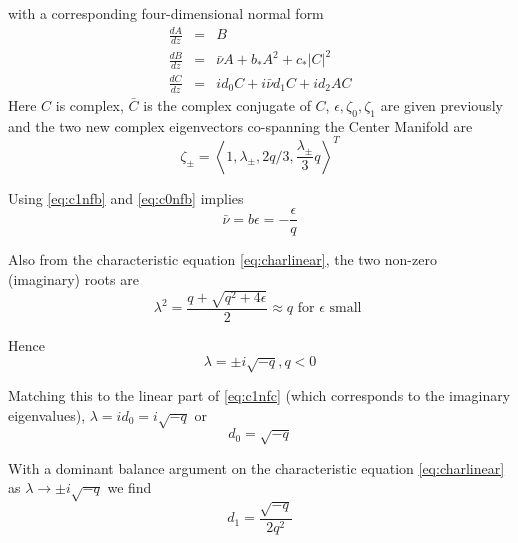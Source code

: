 with  a corresponding four-dimensional normal form
\begin{subequations}\label{eq:c1nf}
\begin{eqnarray}
\frac{dA}{dz} &=& B  \label{eq:c1nfa} \\
\frac{dB}{dz} &=& \bar{\nu} A + b_* A^2 + c_* \left|C\right|^2  \label{eq:c1nfb} \\
\frac{dC}{dz} &=& i d_0 C + i \bar{\nu} d_1 C + i d_2 A C \label{eq:c1nfc}
\end{eqnarray}
\end{subequations}
Here $C$ is complex, $\bar{C}$ is the complex conjugate of $C$, $\epsilon, \zeta_0, \zeta_1$ are given previously and the two new
complex eigenvectors co-spanning the Center Manifold are
\begin{equation}
\zeta_\pm	 = \left< 1, \lambda_\pm, 2 q / 3, \frac{\lambda_\pm}{3} q\right>^T 
\end{equation}

Using \eqref{eq:c1nfb} and \eqref{eq:c0nfb} implies
\begin{equation}
\bar{\nu} = b \epsilon = -\frac{\epsilon}{q} 
\end{equation}

Also from the characteristic equation \eqref{eq:charlinear}, the two non-zero 
(imaginary) roots are 
\begin{equation}
\lambda^2 = \frac{ q + \sqrt{q^2 + 4 \epsilon } }{2} \approx q \textrm{ for } \epsilon \textrm{ small }
\end{equation}

Hence
\begin{equation}
\lambda = \pm i \sqrt{-q}, q < 0
\end{equation}

Matching this to the linear part of \eqref{eq:c1nfc} 
 (which corresponds to the imaginary eigenvalues), $\lambda = i d_0 = i \sqrt{-q}$ or 
\begin{equation}
d_0 = \sqrt{-q}
\end{equation}

With a dominant balance argument on the characteristic equation \eqref{eq:charlinear} as  $\lambda \rightarrow \pm i \sqrt{-q}$ we find
\begin{equation}
d_1 = \frac{\sqrt{-q}}{2 q^2} 
\end{equation}

